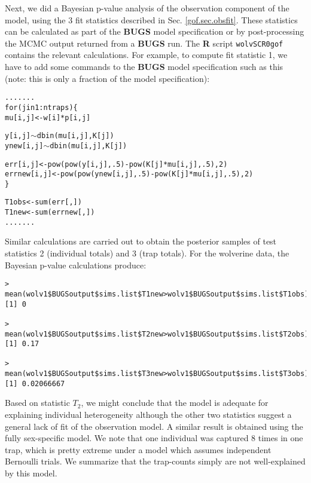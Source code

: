 Next, we did a Bayesian p-value analysis of the observation component
of the model, using the 3 fit statistics
described
in Sec. \ref{gof.sec.obsfit}.
These statistics can be calculated as part of
the {\bf BUGS} model specification or by post-processing the MCMC
output returned from a {\bf BUGS} run.
The {\bf R} script \mbox{\tt wolvSCR0gof} contains the relevant
calculations.  For example, to compute fit statistic 1, we have to add
some commands to the {\bf
  BUGS} model specification such as this (note: this is only a
fraction of the model specification):
\begin{alltt}
.......
for(j in 1:ntraps)\{
 mu[i,j] <- w[i]*p[i,j]

 y[i,j] \(\sim\) dbin(mu[i,j],K[j])
ynew[i,j] \(\sim\) dbin(mu[i,j],K[j])

err[i,j] <-  pow(pow(y[i,j],.5) - pow(K[j]*mu[i,j],.5),2)
errnew[i,j] <- pow(pow(ynew[i,j],.5) - pow(K[j]*mu[i,j],.5),2)
\}

T1obs <- sum(err[,])
T1new <- sum(errnew[,])
.......
\end{alltt}
Similar calculations are carried out to obtain the posterior samples
of test statistics 2 (individual totals) and 3 (trap totals). For the
wolverine data, the Bayesian p-value calculations produce:
{\small
\begin{verbatim}
> mean(wolv1$BUGSoutput$sims.list$T1new>wolv1$BUGSoutput$sims.list$T1obs)
[1] 0

> mean(wolv1$BUGSoutput$sims.list$T2new>wolv1$BUGSoutput$sims.list$T2obs)
[1] 0.17

> mean(wolv1$BUGSoutput$sims.list$T3new>wolv1$BUGSoutput$sims.list$T3obs)
[1] 0.02066667
\end{verbatim}
}
Based on statistic  $T_2$, we might conclude that the model
is adequate for explaining individual heterogeneity although the other
two statistics 
 suggest a general lack of fit of the observation model.
A similar result is obtained using the fully sex-specific
model.
We 
note that one individual was captured 8 times in one trap, which is
pretty extreme under a model which assumes independent Bernoulli
trials. We summarize that the trap-counts simply are not
well-explained by this model.

\begin{comment}
This produces:
\begin{verbatim}
fully sex-specific model:
>  mean(wolv4$BUGSoutput$sims.list$T1new>wolv4$BUGSoutput$sims.list$T1obs)
[1] 0
>  mean(wolv4$BUGSoutput$sims.list$T2new>wolv4$BUGSoutput$sims.list$T2obs)
[1] 0.234
>  mean(wolv4$BUGSoutput$sims.list$T3new>wolv4$BUGSoutput$sims.list$T3obs)
[1] 0.02133333
\end{verbatim}
which doesn't improve fit very much at all.
\end{comment}

